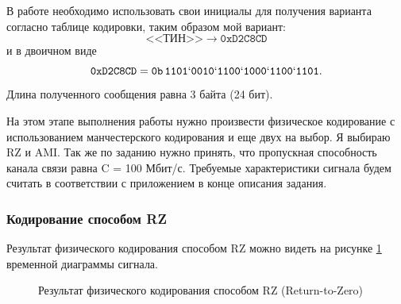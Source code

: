 \tableofcontents


\newpage
\Chapter{\lab\ \labnumber}{\labtheme}{}



В работе необходимо использовать свои инициалы для получения 
варианта согласно таблице кодировки, таким образом мой вариант:
$$
\text{<<ТИН>>} \to \mathtt{0xD2C8CD}
$$
и в двоичном виде
$$
\mathtt{0xD2C8CD} = \mathtt{0b\,1101`0010`1100`1000`1100`1101}.
$$
Длина полученного сообщения равна 3 байта (24 бит).


На этом этапе выполнения работы нужно произвести физическое 
кодирование с использованием манчестерского кодирования и еще 
двух на выбор. Я выбираю RZ и AMI.
%
Так же по заданию нужно принять, что пропускная способность канала
связи равна C = 100 Мбит/с. Требуемые характеристики сигнала будем считать в соответствии с приложением в конце описания задания. 
\\

\subsubsection{Кодирование способом RZ}

Результат физического кодирования способом RZ можно видеть на рисунке \ref{fig:rz-encode} временной диаграммы сигнала.
\begin{figure}[H] %
    \centering
    {\setlength{\fboxsep}{0pt}\setlength{\fboxrule}{1pt}%
    }
    \caption{Результат физического кодирования способом RZ (Return-to-Zero)}
    \label{fig:rz-encode}
\end{figure}

